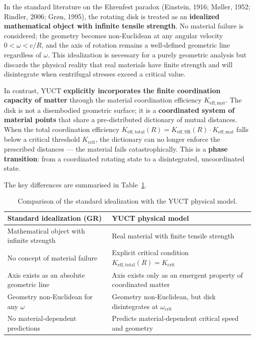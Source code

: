 \documentclass[12pt,a4paper]{article}
\newcommand{\Keffmat}{K_{\mathrm{eff,mat}}}
\newcommand{\Kefftot}{K_{\mathrm{eff,total}}}
\newcommand{\KeffSR}{K_{\mathrm{eff,SR}}}
\newcommand{\Kcrit}{K_{\mathrm{crit}}}
\begin{document}
	In the standard literature on the Ehrenfest paradox (Einstein, 1916; Møller, 1952; Rindler, 2006; Grøn, 1995), the rotating disk is treated as an \textbf{idealized mathematical object with infinite tensile strength}. No material failure is considered; the geometry becomes non‑Euclidean at any angular velocity \(0 < \omega < c/R\), and the axis of rotation remains a well‑defined geometric line regardless of \(\omega\). This idealization is necessary for a purely geometric analysis but discards the physical reality that real materials have finite strength and will disintegrate when centrifugal stresses exceed a critical value.
	
	In contrast, YUCT \textbf{explicitly incorporates the finite coordination capacity of matter} through the material coordination efficiency \(K_{\mathrm{eff,mat}}\). The disk is not a disembodied geometric surface; it is a \textbf{coordinated system of material points} that share a pre‑distributed dictionary of mutual distances. When the total coordination efficiency \(\Kefftot(R) = \KeffSR(R) \cdot \Keffmat\) falls below a critical threshold \(\Kcrit\), the dictionary can no longer enforce the prescribed distances — the material fails catastrophically. This is a \textbf{phase transition}: from a coordinated rotating state to a disintegrated, uncoordinated state.
	
	The key differences are summarised in Table~\ref{tab:idealization}.
	
	\begin{table}[h]
		\centering
		\caption{Comparison of the standard idealization with the YUCT physical model.}
		\label{tab:idealization}
		\begin{tabular}{p{5cm}p{5cm}}
			\toprule
			\textbf{Standard idealization (GR)} & \textbf{YUCT physical model} \\
			\midrule
			Mathematical object with infinite strength & Real material with finite tensile strength \\
			No concept of material failure & Explicit critical condition \(\Kefftot(R) = \Kcrit\) \\
			Axis exists as an absolute geometric line & Axis exists only as an emergent property of coordinated matter \\
			Geometry non‑Euclidean for any \(\omega\) & Geometry non‑Euclidean, but disk disintegrates at \(\omega_{\text{crit}}\) \\
			No material‑dependent predictions & Predicts material‑dependent critical speed and geometry \\
			\bottomrule
		\end{tabular}
	\end{table}
	
\end{document}
